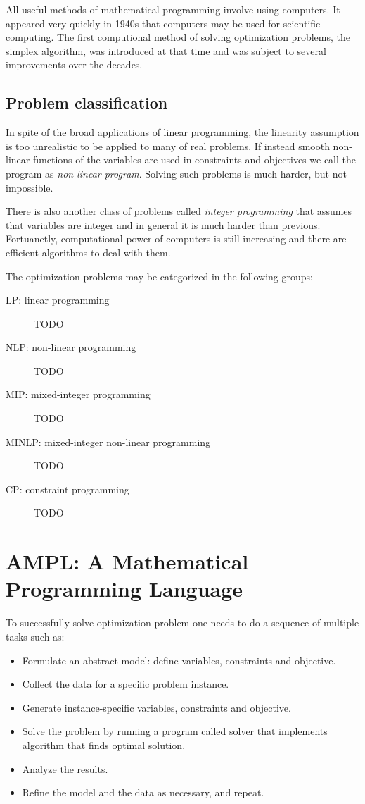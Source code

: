 All useful methods of mathematical programming involve using computers. It appeared very quickly in 1940s that computers may be used for scientific computing. The first computional method of solving optimization problems, the simplex algorithm, was introduced at that time and was subject to several improvements over the decades.

\subsection{Problem classification}

In spite of the broad applications of linear programming, the linearity assumption is too unrealistic to be applied to many of real problems. If instead smooth non-linear functions of the variables are used in constraints and objectives we call the program as \emph{non-linear program}. Solving such problems is much harder, but not impossible.

There is also another class of problems called \emph{integer programming} that assumes that variables are integer and in general it is much harder than previous. Fortuanetly, computational power of computers is still increasing and there are efficient algorithms to deal with them.

The optimization problems may be categorized in the following groups:
\begin{description}
  \item[LP: linear programming] TODO
  \item[NLP: non-linear programming] TODO
  \item[MIP: mixed-integer programming] TODO
  \item[MINLP: mixed-integer non-linear programming] TODO
  \item[CP: constraint programming] TODO
\end{description}

\section{AMPL: A Mathematical Programming Language}

To successfully solve optimization problem one needs to do a sequence of multiple tasks such as:

\begin{itemize}
  \item Formulate an abstract model: define variables, constraints and objective.
  \item Collect the data for a specific problem instance.
  \item Generate instance-specific variables, constraints and objective.
  \item Solve the problem by running a program called solver that implements algorithm that finds optimal solution.
  \item Analyze the results.
  \item Refine the model and the data as necessary, and repeat.
\end{itemize}

